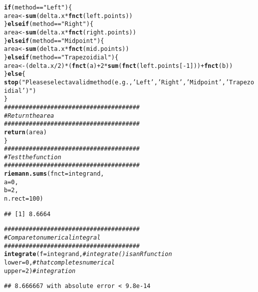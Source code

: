\documentclass{article}\usepackage[]{graphicx}\usepackage[]{xcolor}
\makeatletter
\newcommand{\hlnum}[1]{\textcolor[rgb]{0.686,0.059,0.569}{#1}}%
\newcommand{\hlsng}[1]{\textcolor[rgb]{0.192,0.494,0.8}{#1}}%
\newcommand{\hlcom}[1]{\textcolor[rgb]{0.678,0.584,0.686}{\textit{#1}}}%
\newcommand{\hlopt}[1]{\textcolor[rgb]{0,0,0}{#1}}%
\newcommand{\hldef}[1]{\textcolor[rgb]{0.345,0.345,0.345}{#1}}%
\newcommand{\hlkwa}[1]{\textcolor[rgb]{0.161,0.373,0.58}{\textbf{#1}}}%
\newcommand{\hlkwb}[1]{\textcolor[rgb]{0.69,0.353,0.396}{#1}}%
\newcommand{\hlkwc}[1]{\textcolor[rgb]{0.333,0.667,0.333}{#1}}%
\newcommand{\hlkwd}[1]{\textcolor[rgb]{0.737,0.353,0.396}{\textbf{#1}}}%
\newenvironment{kframe}{%
 \def\at@end@of@kframe{}%
 \ifinner\ifhmode%
  \def\at@end@of@kframe{\end{minipage}}%
  \begin{minipage}{\columnwidth}%
 \fi\fi%
 \def\FrameCommand##1{\hskip\@totalleftmargin \hskip-\fboxsep
 \colorbox{shadecolor}{##1}\hskip-\fboxsep
     \hskip-\linewidth \hskip-\@totalleftmargin \hskip\columnwidth}%
 \MakeFramed {\advance\hsize-\width
   \@totalleftmargin\z@ \linewidth\hsize
   \@setminipage}}%
 {\par\unskip\endMakeFramed%
 \at@end@of@kframe}
\newenvironment{knitrout}{}{} %
\makeatother
\begin{document}
\begin{enumerate}
\begin{enumerate}
\begin{knitrout}
\begin{kframe}
\begin{alltt}
  \hlkwa{if}\hldef{(method} \hlopt{==} \hlsng{"Left"}\hldef{)\{}
    \hldef{area} \hlkwb{<-} \hlkwd{sum}\hldef{(delta.x}\hlopt{*}\hlkwd{fnct}\hldef{(left.points))}
  \hldef{\}}\hlkwa{else if}\hldef{(method} \hlopt{==} \hlsng{"Right"}\hldef{)\{}
    \hldef{area} \hlkwb{<-} \hlkwd{sum}\hldef{(delta.x}\hlopt{*}\hlkwd{fnct}\hldef{(right.points))}
  \hldef{\}}\hlkwa{else if}\hldef{(method} \hlopt{==} \hlsng{"Midpoint"}\hldef{)\{}
   \hldef{area} \hlkwb{<-} \hlkwd{sum}\hldef{(delta.x}\hlopt{*}\hlkwd{fnct}\hldef{(mid.points))}
  \hldef{\}}\hlkwa{else if}\hldef{(method} \hlopt{==} \hlsng{"Trapezoidial"}\hldef{)\{}
    \hldef{area} \hlkwb{<-} \hldef{(delta.x} \hlopt{/} \hlnum{2}\hldef{)} \hlopt{*} \hldef{(}\hlkwd{fnct}\hldef{(a)} \hlopt{+} \hlnum{2} \hlopt{*} \hlkwd{sum}\hldef{(}\hlkwd{fnct}\hldef{(left.points[}\hlopt{-}\hlnum{1}\hldef{]))} \hlopt{+} \hlkwd{fnct}\hldef{(b))}
  \hldef{\}}\hlkwa{else}\hldef{\{}
    \hlkwd{stop}\hldef{(}\hlsng{"Please select a valid method (e.g., 'Left', 'Right', 'Midpoint', 'Trapezoidial')"}\hldef{)}
  \hldef{\}}
  \hlcom{######################################}
  \hlcom{# Return the area}
  \hlcom{######################################}
  \hlkwd{return}\hldef{(area)}
\hldef{\}}
\hlcom{######################################}
\hlcom{# Test the function}
\hlcom{######################################}
\hlkwd{riemann.sums}\hldef{(}\hlkwc{fnct} \hldef{= integrand,}
             \hlkwc{a} \hldef{=} \hlnum{0}\hldef{,}
             \hlkwc{b} \hldef{=} \hlnum{2}\hldef{,}
             \hlkwc{n.rect} \hldef{=} \hlnum{100}\hldef{)}
\end{alltt}
\begin{verbatim}
## [1] 8.6664
\end{verbatim}
\begin{alltt}
\hlcom{######################################}
\hlcom{# Compare to numerical integral}
\hlcom{######################################}
\hlkwd{integrate}\hldef{(}\hlkwc{f} \hldef{= integrand,} \hlcom{# integrate() is an R function}
          \hlkwc{lower} \hldef{=} \hlnum{0}\hldef{,}     \hlcom{# that completes numerical}
          \hlkwc{upper} \hldef{=} \hlnum{2}\hldef{)}     \hlcom{# integration}
\end{alltt}
\begin{verbatim}
## 8.666667 with absolute error < 9.8e-14
\end{verbatim}
\end{kframe}
\end{knitrout}
\end{enumerate}
\end{enumerate}


\end{document}
